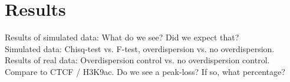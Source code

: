 \section{Results}

Results of simulated data: What do we see? Did we expect that?\\
Simulated data: Chisq-test vs. F-test, overdispersion vs. no overdispersion.\\
Results of real data: Overdispersion control vs. no overdispersion control.\\
Compare to CTCF / H3K9ac. Do we see a peak-loss? If so, what percentage?